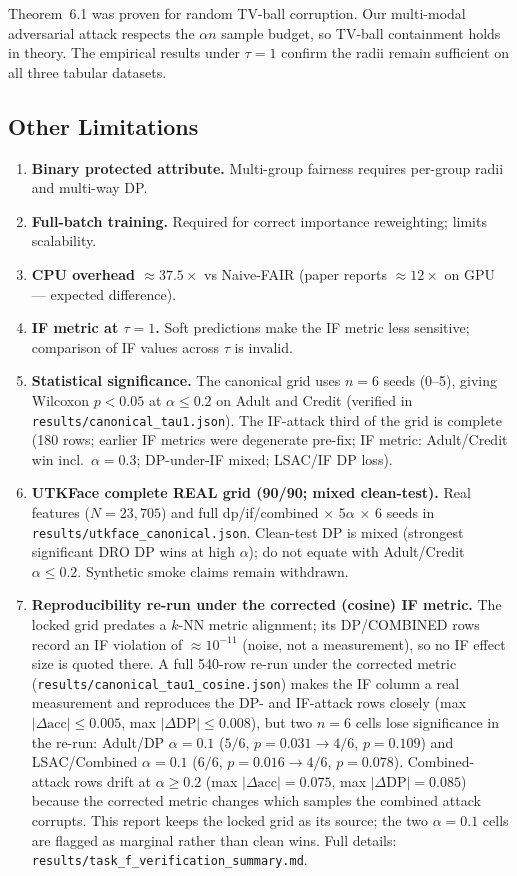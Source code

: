 \documentclass[11pt,a4paper]{article}
\begin{document}
Theorem~6.1 was proven for random TV-ball corruption.  Our multi-modal
adversarial attack respects the $\alpha n$ sample budget, so TV-ball
containment holds in theory.  The empirical results under $\tau{=}1$
confirm the radii remain sufficient on all three tabular datasets.

\subsection{Other Limitations}

\begin{enumerate}
\item \textbf{Binary protected attribute.}
  Multi-group fairness requires per-group radii and multi-way DP.
\item \textbf{Full-batch training.}
  Required for correct importance reweighting; limits scalability.
\item \textbf{CPU overhead $\approx 37.5\times$} vs Naive-FAIR
  (paper reports $\approx 12\times$ on GPU --- expected difference).
\item \textbf{IF metric at $\tau{=}1$.}
  Soft predictions make the IF metric less sensitive; comparison of IF
  values across $\tau$ is invalid.
\item \textbf{Statistical significance.}
  The canonical grid uses $n{=}6$ seeds (0--5), giving Wilcoxon
  $p{<}0.05$ at $\alpha\le0.2$ on Adult and Credit (verified in
  \texttt{results/canonical\_tau1.json}).  The IF-attack third of the
  grid is complete (180 rows; earlier IF metrics were degenerate pre-fix;
  IF metric: Adult/Credit win incl.\ $\alpha{=}0.3$; DP-under-IF mixed; LSAC/IF DP loss).
\item \textbf{UTKFace complete REAL grid (90/90; mixed clean-test).}
  Real features ($N{=}23{,}705$) and full dp/if/combined $\times$ $5\alpha$ $\times$ $6$ seeds
  in \texttt{results/utkface\_canonical.json}.  Clean-test DP is mixed
  (strongest significant DRO DP wins at high $\alpha$); do not equate with
  Adult/Credit $\alpha\le0.2$.  Synthetic smoke claims remain withdrawn.
\item \textbf{Reproducibility re-run under the corrected (cosine) IF metric.}
  The locked grid predates a $k$-NN metric alignment; its DP/COMBINED rows
  record an IF violation of $\approx10^{-11}$ (noise, not a measurement), so
  no IF effect size is quoted there. A full 540-row re-run under the
  corrected metric
  (\texttt{results/canonical\_tau1\_cosine.json}) makes the IF column a real
  measurement and reproduces the DP- and IF-attack rows closely (max
  $|\Delta \mathrm{acc}|\le0.005$, max $|\Delta \mathrm{DP}|\le0.008$),
  but two $n{=}6$ cells lose significance in the re-run: Adult/DP
  $\alpha{=}0.1$ ($5/6$, $p{=}0.031\to4/6$, $p{=}0.109$) and LSAC/Combined
  $\alpha{=}0.1$ ($6/6$, $p{=}0.016\to4/6$, $p{=}0.078$). Combined-attack
  rows drift at $\alpha\ge0.2$ (max $|\Delta \mathrm{acc}|=0.075$, max
  $|\Delta \mathrm{DP}|=0.085$) because the corrected metric changes which
  samples the combined attack corrupts. This report keeps the locked grid
  as its source; the two $\alpha{=}0.1$ cells are flagged as marginal rather
  than clean wins. Full details: \texttt{results/task\_f\_verification\_summary.md}.
\end{enumerate}
\end{document}
